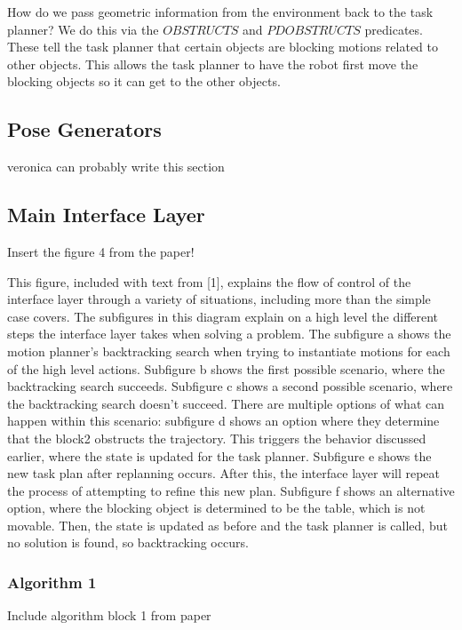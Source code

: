 \documentclass[12pt]{article}
\begin{document}
How do we pass geometric information from the environment back to the task planner?  
We do this via the $OBSTRUCTS$ and $PDOBSTRUCTS$ predicates.  
These tell the task planner that certain objects are blocking motions related to other objects.  
This allows the task planner to have the robot first move the blocking objects so it can get to the other objects.


\subsection{Pose Generators}

veronica can probably write this section

\subsection{Main Interface Layer}

Insert the figure 4 from the paper!

This figure, included with text from [1], explains the flow of control of the interface layer through a variety of situations, including more than the simple case covers.  
The subfigures in this diagram explain on a high level the different steps the interface layer takes when solving a problem.  
The subfigure a shows the motion planner's backtracking search when trying to instantiate motions for each of the high level actions.  
Subfigure b shows the first possible scenario, where the backtracking search succeeds.  Subfigure c shows a second possible scenario, where the backtracking search doesn't succeed.  
There are multiple options of what can happen within this scenario: subfigure d shows an option where they determine that the block2 obstructs the trajectory.  
This triggers the behavior discussed earlier, where the state is updated for the task planner.  
Subfigure e shows the new task plan after replanning occurs.  
After this, the interface layer will repeat the process of attempting to refine this new plan.  
Subfigure f shows an alternative option, where the blocking object is determined to be the table, which is not movable.  
Then, the state is updated as before and the task planner is called, but no solution is found, so backtracking occurs.

\subsubsection{Algorithm 1}

Include algorithm block 1 from paper
\end{document}
